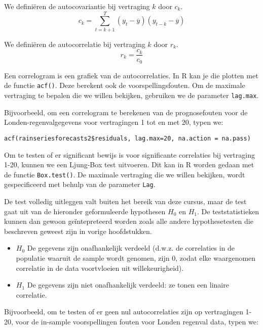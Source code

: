\begin{definition}[Autocovariantie]
	We definiëren de autocovariantie bij vertraging $k$ door $c_k$.
	\[ c_k = \sum_{t=k+1}^{T} (y_t - \overline{y})(y_{t-k} - \overline{y}) \]
\end{definition}

\begin{definition}[Autocorrelatie]
	We definiëren de autocorrelatie bij vertraging $k$ door $r_k$.
	\[ r_k = \frac{c_k}{c_0} \]
\end{definition}

Een correlogram is een grafiek van de autocorrelaties. In R kan je die plotten met de functie \texttt{acf()}. Deze berekent ook de voorspellingsfouten. Om de maximale vertraging te bepalen die we willen bekijken, gebruiken we de parameter \texttt{lag.max}.

Bijvoorbeeld, om een correlogram te berekenen van de prognosefouten voor de Londen-regenvalgegevens voor vertragingen 1 tot en met 20, typen we:

\begin{lstlisting}
acf(rainseriesforecasts2$residuals, lag.max=20, na.action = na.pass)
\end{lstlisting}

Om te testen of er significant bewijs is voor significante correlaties bij vertraging 1-20, kunnen we een Ljung-Box test uitvoeren. Dit kan in R worden gedaan met de functie \texttt{Box.test()}. De maximale vertraging die we willen bekijken, wordt gespecificeerd met behulp van de parameter \texttt{Lag}.

De test volledig uitleggen valt buiten het bereik van deze cursus, maar de test gaat uit van de hieronder geformuleerde hypothesen $H_0$ en $H_1$. De teststatistieken kunnen dan gewoon geïntepreteerd worden zoals alle andere hypothesetesten die beschreven geweest zijn in vorige hoofdstukken. 

\begin{itemize}
  \item $H_0$ De gegevens zijn onafhankelijk verdeeld (d.w.z. de correlaties in de populatie waaruit de sample wordt genomen, zijn 0, zodat elke waargenomen correlatie in de data voortvloeien uit willekeurigheid).
  \item $H_1$ De gegevens zijn niet onafhankelijk verdeeld: ze tonen een linaire correlatie.
\end{itemize}

Bijvoorbeeld, om te testen of er geen nul autocorrelaties zijn op vertragingen 1-20, voor de in-sample voorspellingen fouten voor Londen regenval data, typen we:

